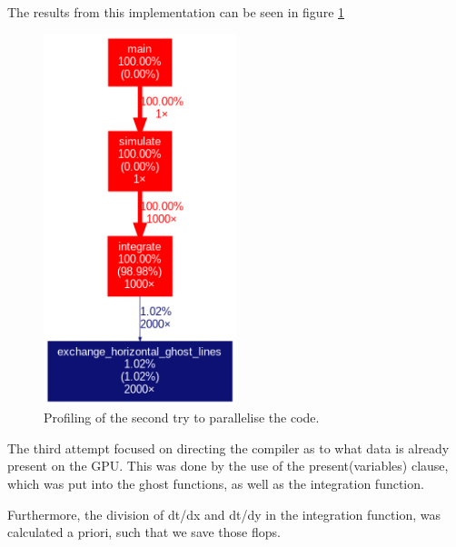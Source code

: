 \documentclass{article}
\begin{document}
The results from this implementation can be seen in figure \ref{fig:profiling:secondattempt}
\begin{figure}[h]
    \includegraphics[width=0.5\textwidth]{./figures/sequential_profile.png}
    \centering
    \caption{Profiling of the second try to parallelise the code. }
    \label{fig:profiling:secondattempt}
\end{figure}

The third attempt focused on directing the compiler as to what data is already present on the GPU. This was done by the use of the present(variables) clause, which was put into the ghost functions, as well as the integration function.

Furthermore, the division of dt/dx and dt/dy in the integration function, was calculated a priori, such that we save those flops.
\end{document}
